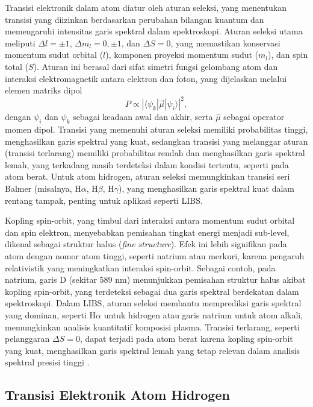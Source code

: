 Transisi elektronik dalam atom diatur oleh aturan seleksi, yang menentukan transisi yang diizinkan berdasarkan perubahan bilangan kuantum dan memengaruhi intensitas garis spektral dalam spektroskopi. Aturan seleksi utama meliputi \( \Delta l = \pm 1 \), \( \Delta m_l = 0, \pm 1 \), dan \( \Delta S = 0 \), yang memastikan konservasi momentum sudut orbital (\( l \)), komponen proyeksi momentum sudut (\( m_l \)), dan spin total (\( S \)). Aturan ini berasal dari sifat simetri fungsi gelombang atom dan interaksi elektromagnetik antara elektron dan foton, yang dijelaskan melalui elemen matriks dipol
\begin{equation}
P \propto |\langle \psi_k | \vec{\mu} | \psi_i \rangle|^2, \label{eq:dipole}
\end{equation}
dengan \( \psi_i \) dan \( \psi_k \) sebagai keadaan awal dan akhir, serta \( \hat{\mu} \) sebagai operator momen dipol. Transisi yang memenuhi aturan seleksi memiliki probabilitas tinggi, menghasilkan garis spektral yang kuat, sedangkan transisi yang melanggar aturan (transisi terlarang) memiliki probabilitas rendah dan menghasilkan garis spektral lemah, yang terkadang masih terdeteksi dalam kondisi tertentu, seperti pada atom berat. Untuk atom hidrogen, aturan seleksi memungkinkan transisi seri Balmer (misalnya, H\(\alpha\), H\(\beta\), H\(\gamma\)), yang menghasilkan garis spektral kuat dalam rentang tampak, penting untuk aplikasi seperti LIBS. 
\par Kopling spin-orbit, yang timbul dari interaksi antara momentum sudut orbital dan spin elektron, menyebabkan pemisahan tingkat energi menjadi sub-level, dikenal sebagai struktur halus (\textit{fine structure}). Efek ini lebih signifikan pada atom dengan nomor atom tinggi, seperti natrium atau merkuri, karena pengaruh relativistik yang meningkatkan interaksi spin-orbit. Sebagai contoh, pada natrium, garis D (sekitar 589 nm) menunjukkan pemisahan struktur halus akibat kopling spin-orbit, yang terdeteksi sebagai dua garis spektral berdekatan dalam spektroskopi. Dalam LIBS, aturan seleksi membantu memprediksi garis spektral yang dominan, seperti H\(\alpha\) untuk hidrogen atau garis natrium untuk atom alkali, memungkinkan analisis kuantitatif komposisi plasma. Transisi terlarang, seperti pelanggaran \( \Delta S = 0 \), dapat terjadi pada atom berat karena kopling spin-orbit yang kuat, menghasilkan garis spektral lemah yang tetap relevan dalam analisis spektral presisi tinggi \citep{Griffiths2005, CremersRadzemski2013, Demtroder2010}.
\subsection{Transisi Elektronik Atom Hidrogen}

